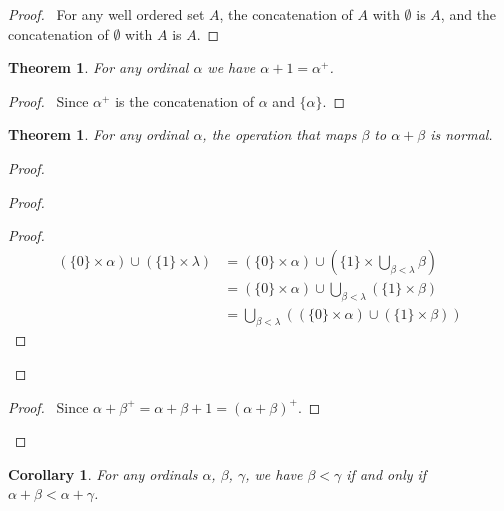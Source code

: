 \documentclass{book}
\let\qed\relax
\newtheorem{cor}{Corollary}[ax]
\newtheorem{thm}[ax]{Theorem}
\theoremstyle{definition}
\begin{document}
\begin{proof}
\pf\ For any well ordered set $A$, the concatenation of $A$ with $\emptyset$ is $A$, and the concatenation of $\emptyset$ with $A$ is $A$. \qed
\end{proof}

\begin{thm}
For any ordinal $\alpha$ we have $\alpha + 1 = \alpha^+$.
\end{thm}

\begin{proof}
\pf\ Since $\alpha^+$ is the concatenation of $\alpha$ and $\{ \alpha \}$. \qed
\end{proof}

\begin{thm}
For any ordinal $\alpha$, the operation that maps $\beta$ to $\alpha + \beta$ is normal.
\end{thm}

\begin{proof}
\pf
{}
\begin{proof}
	\begin{proof}
		\pf
		\begin{align*}
			(\{0\} \times \alpha) \cup (\{1\} \times \lambda) & = (\{0\} \times \alpha) \cup (\{1\} \times \bigcup_{\beta < \lambda} \beta) \\
			& = (\{0\} \times \alpha) \cup \bigcup_{\beta < \lambda} (\{1\} \times \beta) \\
			& = \bigcup_{\beta < \lambda} ((\{0\} \times \alpha) \cup (\{1\} \times \beta))
		\end{align*}
	\end{proof}
\end{proof}
\begin{proof}
	\pf\ Since $\alpha + \beta^+ = \alpha + \beta + 1 = (\alpha + \beta)^+$.
\end{proof}
\qed
\end{proof}

\begin{cor}
\label{cor:pluslt}
For any ordinals $\alpha$, $\beta$, $\gamma$, we have $\beta < \gamma$ if and only if $\alpha + \beta < \alpha + \gamma$.
\end{cor}
\end{document}
